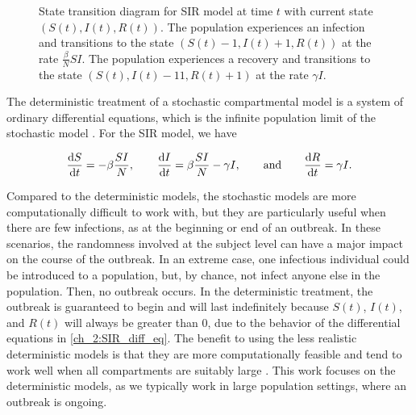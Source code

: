 \begin{figure}
    \centering
    \caption[State transition diagram for SIR model.]{State transition diagram for SIR model at time \( t \) with current state \( (S(t), I(t), R(t)) \).
    The population experiences an infection and transitions to the state \( (S(t)-1, I(t)+1, R(t)) \) at the rate \( \frac{\beta}{N}SI \).
    The population experiences a recovery and transitions to the state \( (S(t), I(t)-11, R(t)+1) \) at the rate \( \gamma I \).
    }
    \label{ch_2:fig:stocastic_SIR}
\end{figure}

The deterministic treatment of a stochastic compartmental model is a system of ordinary differential equations, which is the infinite population limit of the stochastic model \citep{Greenwood2009}.
For the SIR model, we have 

\begin{equation}
    \frac{\mathrm{d} S}{\mathrm{d} t} = -\beta \frac{SI}{N}, \qquad
    \frac{\mathrm{d} I}{\mathrm{d} t} = \beta \frac{SI}{N} - \gamma I, \qquad
    \text{and} \qquad
    \frac{\mathrm{d} R}{\mathrm{d} t} = \gamma I
    \text{.}
\label{ch_2:SIR_diff_eq}
\end{equation}

Compared to the deterministic models, the stochastic models are more computationally difficult to work with, but they are particularly useful when there are few infections, as at the beginning or end of an outbreak.
In these scenarios, the randomness involved at the subject level can have a major impact on the course of the outbreak.
In an extreme case, one infectious individual could be introduced to a population, but, by chance, not infect anyone else in the population.
Then, no outbreak occurs.
In the deterministic treatment, the outbreak is guaranteed to begin and will last indefinitely because \( S(t) \), \(  I(t) \), and \( R(t) \) will always be greater than 0, due to the behavior of the differential equations in \eqref{ch_2:SIR_diff_eq}.
The benefit to using the less realistic deterministic models is that they are more computationally feasible and tend to work well when all compartments are suitably large \citep{doi:10.1098/rspb.2015.0347}.
This work focuses on the deterministic models, as we typically work in large population settings, where an outbreak is ongoing.

